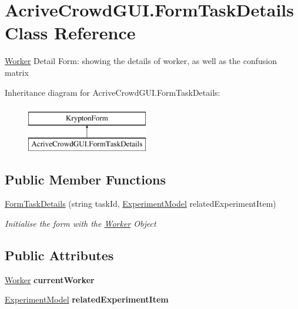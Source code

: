 \hypertarget{class_acrive_crowd_g_u_i_1_1_form_task_details}{}\section{Acrive\+Crowd\+G\+U\+I.\+Form\+Task\+Details Class Reference}
\label{class_acrive_crowd_g_u_i_1_1_form_task_details}


\hyperlink{class_acrive_crowd_g_u_i_1_1_worker}{Worker} Detail Form\+: showing the details of worker, as well as the confusion matrix  


Inheritance diagram for Acrive\+Crowd\+G\+U\+I.\+Form\+Task\+Details\+:\begin{figure}[H]
\begin{center}
\leavevmode
\includegraphics[height=2.000000cm]{class_acrive_crowd_g_u_i_1_1_form_task_details}
\end{center}
\end{figure}
\subsection*{Public Member Functions}
\begin{DoxyCompactItemize}
\item 
\hyperlink{class_acrive_crowd_g_u_i_1_1_form_task_details_af2329210f27a4296f5ea9f257849c169}{Form\+Task\+Details} (string task\+Id, \hyperlink{class_acrive_crowd_g_u_i_1_1_experiment_model}{Experiment\+Model} related\+Experiment\+Item)
\begin{DoxyCompactList}\small\item\em Initialise the form with the \hyperlink{class_acrive_crowd_g_u_i_1_1_worker}{Worker} Object \end{DoxyCompactList}\end{DoxyCompactItemize}
\subsection*{Public Attributes}
\begin{DoxyCompactItemize}
\item 
\hypertarget{class_acrive_crowd_g_u_i_1_1_form_task_details_aba3b4cbc74aa82d90d40bf3ca1e13a8c}{}\hyperlink{class_acrive_crowd_g_u_i_1_1_worker}{Worker} {\bfseries current\+Worker}\label{class_acrive_crowd_g_u_i_1_1_form_task_details_aba3b4cbc74aa82d90d40bf3ca1e13a8c}

\item 
\hypertarget{class_acrive_crowd_g_u_i_1_1_form_task_details_a8862caead2ec8d4e0d4d267a9a86e59c}{}\hyperlink{class_acrive_crowd_g_u_i_1_1_experiment_model}{Experiment\+Model} {\bfseries related\+Experiment\+Item}\label{class_acrive_crowd_g_u_i_1_1_form_task_details_a8862caead2ec8d4e0d4d267a9a86e59c}

\end{DoxyCompactItemize}
